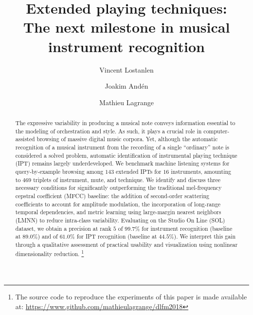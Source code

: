 \documentclass[sigconf]{acmart}
\begin{document}
\title{Extended playing techniques:\\
The next milestone in musical instrument recognition}

\author{Vincent Lostanlen}

\author{Joakim And\'{e}n}

\author{Mathieu Lagrange}

\renewcommand{\shortauthors}{V. Lostanlen et al.}

\newcommand\blfootnote[1]{%
  \begingroup
  \renewcommand\thefootnote{}\footnote{#1}%
  \addtocounter{footnote}{-1}%
  \endgroup
}


\begin{abstract}
The expressive variability in producing a musical note conveys information essential to the modeling of orchestration and style.
As such, it plays a crucial role in computer-assisted browsing of massive digital music corpora.
Yet, although the automatic recognition of a musical instrument from the recording of a single ``ordinary'' note is considered a solved problem, automatic identification of instrumental playing technique (IPT) remains largely underdeveloped.
We benchmark machine listening systems for query-by-example browsing among $143$ extended IPTs for $16$ instruments, amounting to $469$ triplets of instrument, mute, and technique. We identify and discuss three necessary conditions for significantly outperforming the traditional mel-frequency cepstral coefficient (MFCC) baseline: the addition of second-order scattering coefficients to account for amplitude modulation, the incorporation of long-range temporal dependencies, and metric learning using large-margin nearest neighbors (LMNN) to reduce intra-class variability.
Evaluating on the Studio On Line (SOL) dataset, we obtain a precision at rank $5$ of $99.7\%$ for instrument recognition (baseline at $89.0\%$) and of $61.0\%$ for IPT recognition (baseline at $44.5\%$).
We interpret this gain through a qualitative assessment of practical usability and visualization using nonlinear dimensionality reduction.
\blfootnote{
The source code to reproduce the experiments of this paper is made available at: \url{https://www.github.com/mathieulagrange/dlfm2018}}
\end{abstract}
\end{document}
